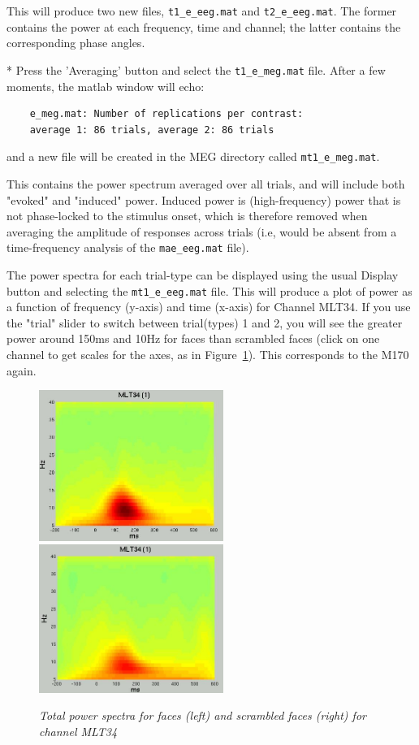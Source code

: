 This will produce two new files, \verb!t1_e_eeg.mat! and  \verb!t2_e_eeg.mat!. The former contains the power at each frequency, time and channel; the latter contains the corresponding phase angles.

* Press the 'Averaging' button and select the \verb!t1_e_meg.mat! file. After a few moments, the matlab window will echo:
\begin{verbatim}
    e_meg.mat: Number of replications per contrast:
    average 1: 86 trials, average 2: 86 trials
\end{verbatim}
    and a new file will be created in the MEG directory called \verb!mt1_e_meg.mat!.

This contains the power spectrum averaged over all trials, and will include both "evoked" and "induced" power. Induced power is (high-frequency) power that is not phase-locked to the stimulus onset, which is therefore removed when averaging the amplitude of responses across trials (i.e, would be absent from a time-frequency analysis of the \verb!mae_eeg.mat! file).

The power spectra for each trial-type can be displayed using the usual Display button and selecting the \verb!mt1_e_eeg.mat! file. This will produce a plot of power as a function of frequency (y-axis) and time (x-axis) for Channel MLT34. If you use the "trial" slider to switch between trial(types) 1 and 2, you will see the greater power around 150ms and 10Hz for faces than scrambled faces (click on one channel to get scales for the axes, as in Figure~\ref{fig_32_13}). This corresponds to the M170 again.

\begin{figure}
\begin{center}
\includegraphics[width=60mm]{multimodal/figures/figure_32_13_L}
\includegraphics[width=60mm]{multimodal/figures/figure_32_13_R}
\caption{\em  Total power spectra for faces (left) and scrambled faces (right) for channel MLT34\label{fig_32_13}}
\end{center}
\end{figure}

